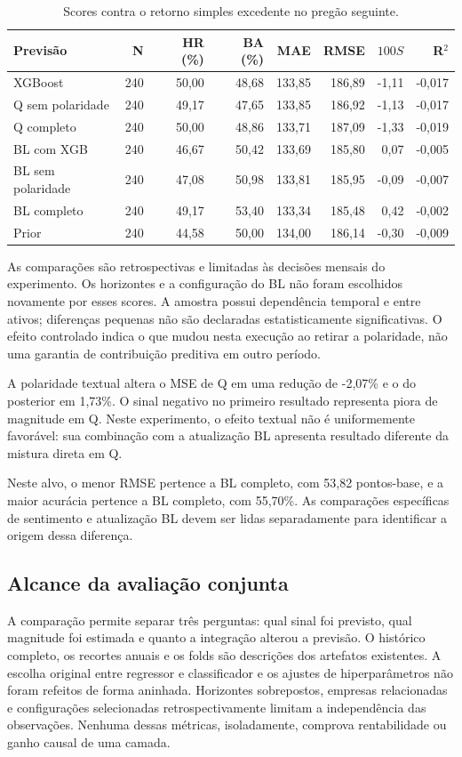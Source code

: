 \begin{table}[H]\centering
\caption{Scores contra o retorno simples excedente no pregão seguinte.}
{\footnotesize\begin{tabular}{lrrrrrrr}\hline
Previsão & N & HR (\%) & BA (\%) & MAE & RMSE & $100S$ & R$^2$\\ \hline
XGBoost & 240 & 50,00 & 48,68 & 133,85 & 186,89 & -1,11 & -0,017\\
Q sem polaridade & 240 & 49,17 & 47,65 & 133,85 & 186,92 & -1,13 & -0,017\\
Q completo & 240 & 50,00 & 48,86 & 133,71 & 187,09 & -1,33 & -0,019\\
BL com XGB & 240 & 46,67 & 50,42 & 133,69 & 185,80 & 0,07 & -0,005\\
BL sem polaridade & 240 & 47,08 & 50,98 & 133,81 & 185,95 & -0,09 & -0,007\\
BL completo & 240 & 49,17 & 53,40 & 133,34 & 185,48 & 0,42 & -0,002\\
Prior & 240 & 44,58 & 50,00 & 134,00 & 186,14 & -0,30 & -0,009\\
\hline\end{tabular}}\par{}\end{table}

As comparações são retrospectivas e limitadas às decisões mensais do experimento. Os horizontes e a configuração do BL não foram escolhidos novamente por esses scores. A amostra possui dependência temporal e entre ativos; diferenças pequenas não são declaradas estatisticamente significativas. O efeito controlado indica o que mudou nesta execução ao retirar a polaridade, não uma garantia de contribuição preditiva em outro período.

A polaridade textual altera o MSE de Q em uma redução de -2,07\% e o do posterior em 1,73\%. O sinal negativo no primeiro resultado representa piora de magnitude em Q. Neste experimento, o efeito textual não é uniformemente favorável: sua combinação com a atualização BL apresenta resultado diferente da mistura direta em Q.

Neste alvo, o menor RMSE pertence a BL completo, com 53,82 pontos-base, e a maior acurácia pertence a BL completo, com 55,70\%. As comparações específicas de sentimento e atualização BL devem ser lidas separadamente para identificar a origem dessa diferença.

\subsection{Alcance da avaliação conjunta}

A comparação permite separar três perguntas: qual sinal foi previsto, qual magnitude foi estimada e quanto a integração alterou a previsão. O histórico completo, os recortes anuais e os folds são descrições dos artefatos existentes. A escolha original entre regressor e classificador e os ajustes de hiperparâmetros não foram refeitos de forma aninhada. Horizontes sobrepostos, empresas relacionadas e configurações selecionadas retrospectivamente limitam a independência das observações. Nenhuma dessas métricas, isoladamente, comprova rentabilidade ou ganho causal de uma camada.
